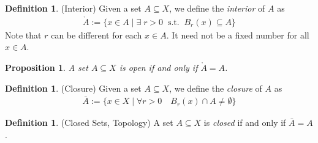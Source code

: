 \documentclass[12pt]{article}
\theoremstyle{plain}
\newtheorem{prop}[thm]{Proposition}
\theoremstyle{definition}
\newtheorem{defn}[thm]{Definition}
\theoremstyle{remark}
\begin{document}
\begin{defn}{(Interior)}
Given a set $A\subseteq X$, we define the \emph{interior} of $A$ as
\begin{align*}
  \mathring{A}
  := \{x \in A \; | \; \exists\; r>0 \;\; \text{s.t.} \;\; B_r(x) \subseteq A\}
\end{align*}
Note that $r$ can be different for each $x\in A$. It need not be a fixed
number for all $x\in A$.
\end{defn}

\begin{prop}
A set $A\subseteq X$ is open if and only if $\mathring{A} = A$.
\end{prop}

\begin{defn}{(Closure)}
Given a set $A\subseteq X$, we define the \emph{closure} of $A$ as
\begin{align*}
  \bar{A}:= \{
    x\in X \;|\;
    \forall r>0 \quad B_r(x) \cap A \neq \emptyset
  \}
\end{align*}
\end{defn}

\begin{defn}{(Closed Sets, Topology)}
\label{defn:closed}
A set $A\subseteq X$ is \emph{closed} if and only if $\bar{A} = A$.
\end{defn}
\end{document}
